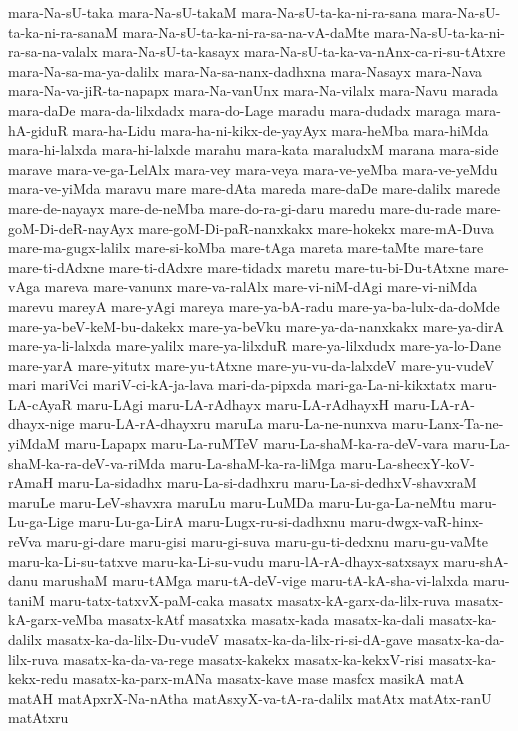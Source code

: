 {mara-Na-sU-taka
mara-Na-sU-takaM
mara-Na-sU-ta-ka-ni-ra-sana
mara-Na-sU-ta-ka-ni-ra-sanaM
mara-Na-sU-ta-ka-ni-ra-sa-na-vA-daMte
mara-Na-sU-ta-ka-ni-ra-sa-na-valalx
mara-Na-sU-ta-kasayx
mara-Na-sU-ta-ka-va-nAnx-ca-ri-su-tAtxre
mara-Na-sa-ma-ya-dalilx
mara-Na-sa-nanx-dadhxna
mara-Nasayx
mara-Nava
mara-Na-va-jiR-ta-napapx
mara-Na-vanUnx
mara-Na-vilalx
mara-Navu
marada
mara-daDe
mara-da-lilxdadx
mara-do-Lage
maradu
mara-dudadx
maraga
mara-hA-giduR
mara-ha-Lidu
mara-ha-ni-kikx-de-yayAyx
mara-heMba
mara-hiMda
mara-hi-lalxda
mara-hi-lalxde
marahu
mara-kata
maraludxM
marana
mara-side
marave
mara-ve-ga-LelAlx
mara-vey
mara-veya
mara-ve-yeMba
mara-ve-yeMdu
mara-ve-yiMda
maravu
mare
mare-dAta
mareda
mare-daDe
mare-dalilx
marede
mare-de-nayayx
mare-de-neMba
mare-do-ra-gi-daru
maredu
mare-du-rade
mare-goM-Di-deR-nayAyx
mare-goM-Di-paR-nanxkakx
mare-hokekx
mare-mA-Duva
mare-ma-gugx-lalilx
mare-si-koMba
mare-tAga
mareta
mare-taMte
mare-tare
mare-ti-dAdxne
mare-ti-dAdxre
mare-tidadx
maretu
mare-tu-bi-Du-tAtxne
mare-vAga
mareva
mare-vanunx
mare-va-ralAlx
mare-vi-niM-dAgi
mare-vi-niMda
marevu
mareyA
mare-yAgi
mareya
mare-ya-bA-radu
mare-ya-ba-lulx-da-doMde
mare-ya-beV-keM-bu-dakekx
mare-ya-beVku
mare-ya-da-nanxkakx
mare-ya-dirA
mare-ya-li-lalxda
mare-yalilx
mare-ya-lilxduR
mare-ya-lilxdudx
mare-ya-lo-Dane
mare-yarA
mare-yitutx
mare-yu-tAtxne
mare-yu-vu-da-lalxdeV
mare-yu-vudeV
mari
mariVci
mariV-ci-kA-ja-lava
mari-da-pipxda
mari-ga-La-ni-kikxtatx
maru-LA-cAyaR
maru-LAgi
maru-LA-rAdhayx
maru-LA-rAdhayxH
maru-LA-rA-dhayx-nige
maru-LA-rA-dhayxru
maruLa
maru-La-ne-nunxva
maru-Lanx-Ta-ne-yiMdaM
maru-Lapapx
maru-La-ruMTeV
maru-La-shaM-ka-ra-deV-vara
maru-La-shaM-ka-ra-deV-va-riMda
maru-La-shaM-ka-ra-liMga
maru-La-shecxY-koV-rAmaH
maru-La-sidadhx
maru-La-si-dadhxru
maru-La-si-dedhxV-shavxraM
maruLe
maru-LeV-shavxra
maruLu
maru-LuMDa
maru-Lu-ga-La-neMtu
maru-Lu-ga-Lige
maru-Lu-ga-LirA
maru-Lugx-ru-si-dadhxnu
maru-dwgx-vaR-hinx-reVva
maru-gi-dare
maru-gisi
maru-gi-suva
maru-gu-ti-dedxnu
maru-gu-vaMte
maru-ka-Li-su-tatxve
maru-ka-Li-su-vudu
maru-lA-rA-dhayx-satxsayx
maru-shA-danu
marushaM
maru-tAMga
maru-tA-deV-vige
maru-tA-kA-sha-vi-lalxda
maru-taniM
maru-tatx-tatxvX-paM-caka
masatx
masatx-kA-garx-da-lilx-ruva
masatx-kA-garx-veMba
masatx-kAtf
masatxka
masatx-kada
masatx-ka-dali
masatx-ka-dalilx
masatx-ka-da-lilx-Du-vudeV
masatx-ka-da-lilx-ri-si-dA-gave
masatx-ka-da-lilx-ruva
masatx-ka-da-va-rege
masatx-kakekx
masatx-ka-kekxV-risi
masatx-ka-kekx-redu
masatx-ka-parx-mANa
masatx-kave
mase
masfcx
masikA
matA
matAH
matApxrX-Na-nAtha
matAsxyX-va-tA-ra-dalilx
matAtx
matAtx-ranU
matAtxru
}
